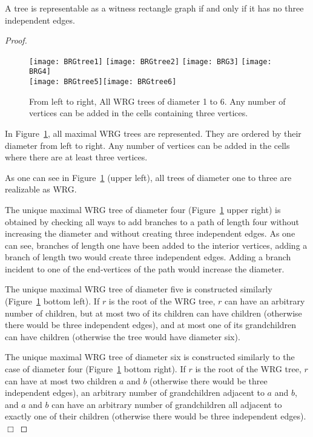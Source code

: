 \documentclass{llncs}
\begin{document}
\begin{theorem}
  \label{tree}
  A tree is representable as a witness rectangle graph if and only if it has no three
  independent edges.
\end{theorem}
\begin{proof}
\begin{figure}
\centering
  \texttt{[image: BRGtree1]}\hfil
  \texttt{[image: BRGtree2]}\hfil
  \texttt{[image: BRG3]}\hfil
  \texttt{[image: BRG4]}\\[2ex]
  \texttt{[image: BRGtree5]}\hfil \texttt{[image: BRGtree6]}
  \caption{From left to right, All WRG trees of diameter 1 to 6.  Any number of vertices can
    be added in the cells containing three vertices.}
      \label{RGtree}
  \end{figure}
In Figure~\ref{RGtree}, all maximal WRG trees are
represented. They are ordered by their diameter from left to
right. Any number of vertices can be added in the cells where there
are at least three vertices.

As one can see in Figure~\ref{RGtree} (upper left), all trees of diameter one to three are realizable as WRG.

The unique maximal WRG tree of diameter four (Figure~\ref{RGtree} upper right) is obtained by checking all ways to add branches to a path of length four without increasing the diameter and without creating three independent edges. As one can see, branches of length one have been added to the interior vertices, adding a branch of length two would create three independent edges. Adding a branch incident to one of the end-vertices of the path would increase the diameter.

The unique maximal WRG tree of diameter five is constructed similarly (Figure~\ref{RGtree} bottom left). 
If $r$ is the root of the WRG tree, $r$ can have an arbitrary number of children, but at most two of its children can have children (otherwise there would be three independent edges), and at most one of its grandchildren can have children (otherwise the tree would have diameter six).


The unique maximal WRG tree of diameter six is constructed similarly
to the case of diameter four (Figure~\ref{RGtree} bottom right).  If
$r$ is the root of the WRG tree, $r$ can have at most two children $a$
and $b$ (otherwise there would be three independent edges), an
arbitrary number of grandchildren adjacent to $a$ and $b$, and $a$
and $b$ can have an arbitrary number of grandchildren all adjacent to
exactly one of their children (otherwise there would be three
independent edges). \mbox{}\hfill $\Box$
\end{proof}
\end{document}
